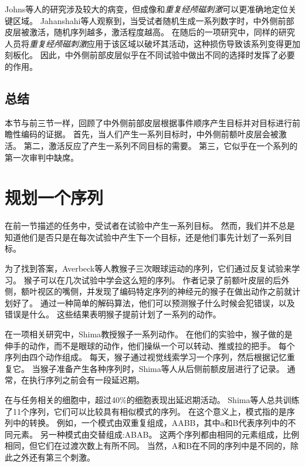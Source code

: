 Johns等人的研究涉及较大的病变，但成像和\textit{重复经颅磁刺激}可以更准确地定位关键区域。
Jahanshahi等人\cite{jahanshahi2000role}观察到，当受试者随机生成一系列数字时，中外侧前部皮层被激活，随机序列越多，激活程度越高。
在随后的一项研究中\cite{jahanshahi1998left}，同样的研究人员将\textit{重复经颅磁刺激}应用于该区域以破坏其活动，这种损伤导致该系列变得更加刻板化。
因此，中外侧前部皮层似乎在不同试验中做出不同的选择时发挥了必要的作用。



\subsection{总结}

本节与前三节一样，回顾了中外侧前部皮层根据事件顺序产生目标并对目标进行前瞻性编码的证据。
首先，当人们产生一系列目标时，中外侧前额叶皮层会被激活。
第二，激活反应了产生一系列不同目标的需要。
第三，它似乎在一个系列的第一次审判中缺席。



\section{规划一个序列}

在前一节描述的任务中，受试者在试验中产生一系列目标。
然而，我们并不总是知道他们是否只是在每次试验中产生下一个目标，还是他们事先计划了一系列目标。


为了找到答案，Averbeck等人\cite{averbeck2006activity}教猴子三次眼球运动的序列，它们通过反复试验来学习。
猴子可以在几次试验中学会这么短的序列。
作者记录了前额叶皮层的后外侧，额叶视区的嘴侧，并发现了编码特定序列的神经元的猴子在做出动作之前就计划好了。
通过一种简单的解码算法，他们可以预测猴子什么时候会犯错误，以及错误是什么。
这些结果表明猴子提前计划了一系列的动作。


在一项相关研究中，Shima\cite{shima2007categorization}教授猴子一系列动作。
在他们的实验中，猴子做的是伸手的动作，而不是眼球的动作，他们操纵一个可以转动、推或拉的把手。
每个序列由四个动作组成。
每天，猴子通过视觉线索学习一个序列，然后根据记忆重复它。
当猴子准备产生各种序列时，Shima等人从后侧前额皮层进行了记录。
通常，在执行序列之前会有一段延迟期。


在与任务相关的细胞中，超过40\%的细胞表现出延迟期活动。
Shima等人\cite{shima2007categorization}总共训练了11个序列，它们可以比较具有相似模式的序列。
在这个意义上，模式指的是序列中的转换。
例如，一个模式由双重复组成，AABB，其中a和B代表序列中的不同元素。
另一种模式由交替组成:ABAB。
这两个序列都由相同的元素组成，比例相同，但它们在过渡次数上有所不同。
当然，A和B在不同的序列中是不同的，除此之外还有第三个刺激。


